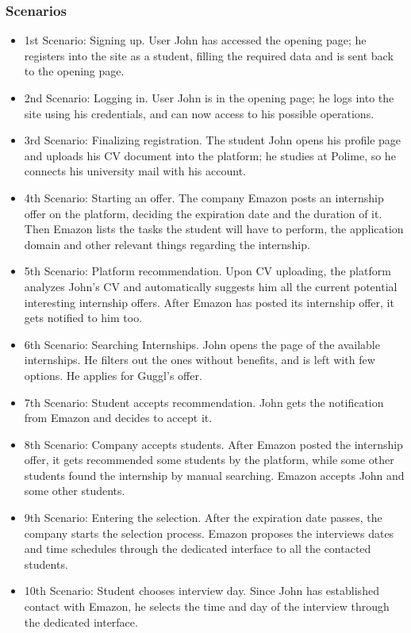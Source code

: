 \documentclass{article}
\begin{document}
\subsubsection{Scenarios}
    \begin{itemize}
        \item 1st Scenario: Signing up. User John has accessed the opening page; he registers into the site as a student, filling the required data and is sent back to the opening page.
        \item 2nd Scenario: Logging in. User John is in the opening page; he logs into the site using his credentials, and can now access to his possible operations.
        \item 3rd Scenario: Finalizing registration. The student John opens his profile page and uploads his CV document into the platform; he studies at Polime, so he connects his university mail with his account.
        \item 4th Scenario: Starting an offer. The company Emazon posts an internship offer on the platform, deciding the expiration date and the duration of it. Then Emazon lists the tasks the student will have to perform, the application domain and other relevant things regarding the internship.  
        \item 5th Scenario: Platform recommendation. Upon CV uploading, the   platform analyzes John's CV and automatically suggests him all the current potential interesting internship offers. After Emazon has posted its internship offer, it gets notified to him too.
        \item 6th Scenario: Searching Internships. John opens the page of the available internships. He filters out the ones without benefits, and is left with few options. He applies for Guggl's offer.
        \item 7th Scenario: Student accepts recommendation. John gets the
        notification from Emazon and decides to accept it.
        \item 8th Scenario: Company accepts students. After Emazon posted the internship offer, it gets recommended some students by the platform, while some other students found the internship by manual searching. Emazon accepts John and some other students.
        \item 9th Scenario: Entering the selection. After the expiration date passes, the company starts the selection process. Emazon proposes the interviews dates and time schedules through the dedicated interface to all the contacted students.
        \item 10th Scenario: Student chooses interview day. Since John has established contact with Emazon, he selects the time and day of the interview through the dedicated interface.

\end{itemize}
\end{document}
